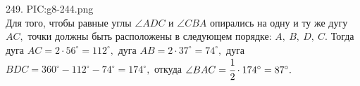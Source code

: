 249. {{PIC:g8-244.png}}\\
Для того, чтобы равные углы $\angle ADC$ и $\angle CBA$ опирались на одну и ту же дугу $AC,$ точки должны быть расположены в следующем порядке: $A,\ B,\ D,\ C.$ Тогда дуга $AC=2\cdot 56^\circ=112^\circ,$ дуга $AB=2\cdot37^\circ=74^\circ,$ дуга $BDC=360^\circ-112^\circ-74^\circ=174^\circ,$ откуда $\angle BAC=\cfrac{1}{2}\cdot 174^\circ=87^\circ.$\\
